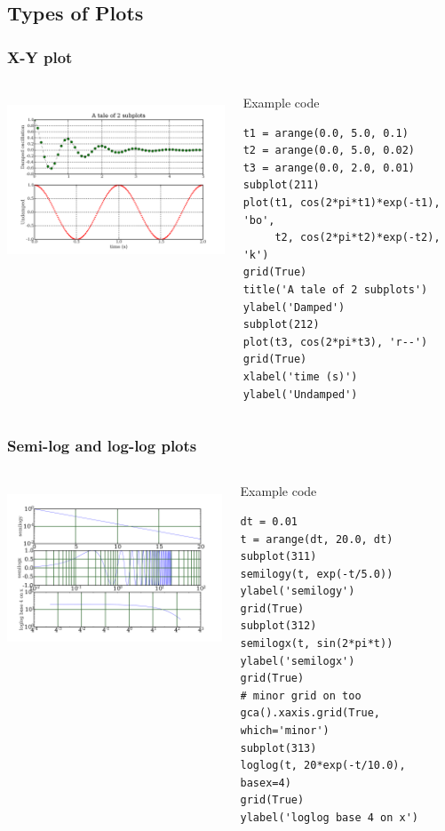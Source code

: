 \documentclass[14pt,compress]{beamer}
\newcounter{time}
\begin{document}
\subsection{Types of Plots}
\begin{frame}[fragile]
  \frametitle{X-Y plot}
  \begin{columns}
    \hspace*{-0.5in}
    \includegraphics[height=2in, interpolate=true]{data/xyplot}
    \begin{block}{Example code}
    \tiny
\begin{lstlisting}
t1 = arange(0.0, 5.0, 0.1)
t2 = arange(0.0, 5.0, 0.02)
t3 = arange(0.0, 2.0, 0.01)
subplot(211)
plot(t1, cos(2*pi*t1)*exp(-t1), 'bo', 
     t2, cos(2*pi*t2)*exp(-t2), 'k')
grid(True)
title('A tale of 2 subplots')
ylabel('Damped')
subplot(212)
plot(t3, cos(2*pi*t3), 'r--')
grid(True)
xlabel('time (s)')
ylabel('Undamped')
\end{lstlisting}
    \end{block}
  \end{columns}
\end{frame}

\begin{frame}[fragile] \frametitle{Semi-log and log-log plots}
  \begin{columns}
    \hspace*{-0.5in}
  \includegraphics[height=2in, interpolate=true]{data/log}  
    \begin{block}{Example code}
    \tiny
\begin{lstlisting}
dt = 0.01
t = arange(dt, 20.0, dt)
subplot(311)
semilogy(t, exp(-t/5.0))
ylabel('semilogy')
grid(True)
subplot(312)
semilogx(t, sin(2*pi*t))
ylabel('semilogx')
grid(True)
# minor grid on too
gca().xaxis.grid(True, which='minor')  
subplot(313)
loglog(t, 20*exp(-t/10.0), basex=4)
grid(True)
ylabel('loglog base 4 on x')
\end{lstlisting}
  \end{block}
\end{columns}
\end{frame}
\end{document}
